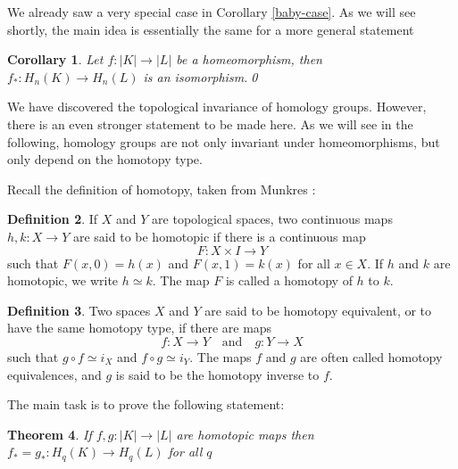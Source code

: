 \documentclass[toc=bib, headinclude]{scrartcl}
\theoremstyle{plain}
\newtheorem{theorem}{Theorem}[section]
\newtheorem{corollary}[theorem]{Corollary}
\theoremstyle{definition}
\newtheorem	{definition}[theorem]{Definition}
\theoremstyle{remark}
\newcommand{\qandq}{\quad \text{and} \quad}
\begin{document}
We already saw a very special case in Corollary \ref{baby-case}. As we will see shortly, the main idea is essentially the same for a more general statement

\begin{corollary}
	Let $f: |K|\to |L| $ be a homeomorphism, then $f_\ast: H_n(K)\to H_n(L)$ is an isomorphism.\qed
\end{corollary}

We have discovered the topological invariance of homology groups. However, there is an even stronger statement to be made here. As we will see in the following, homology groups are not only invariant under homeomorphisms, but only depend on the homotopy type. 

Recall the definition of homotopy, taken from Munkres \cite[p. 94]{mu}:

\begin{definition}
	If $X$ and $Y$ are topological spaces, two continuous maps $h, k: X\to Y$ are said to be homotopic if there is a continuous map \[
	F: X\times I\to Y
	\]
	such that $F(x,0)=h(x)$ and $F(x,1)=k(x)$ for all $x\in X$. If $h$ and $k$ are homotopic, we write $h\simeq k$. The map $F$ is called a homotopy of $h$ to $k$. 
\end{definition}
\begin{definition}\label{def:hom-eq}
	Two spaces $X$ and $Y$ are said to be homotopy equivalent, or to have the same homotopy type, if there are maps\[
	f: X\to Y\qandq g:Y\to X
	\]
	such that $g\circ f\simeq i_X$ and $f\circ g\simeq i_Y$. The maps $f$ and $g$ are often called homotopy equivalences, and $g$ is said to be the homotopy inverse to $f$.
\end{definition}

The main task is to prove the following statement:

\begin{theorem}\label{homotopy_invariance}
	If $f,g:|K|\to |L|$ are homotopic maps then $f_\ast=g_\ast: H_q(K)\to H_q(L)$ for all $q$
\end{theorem}
\end{document}

